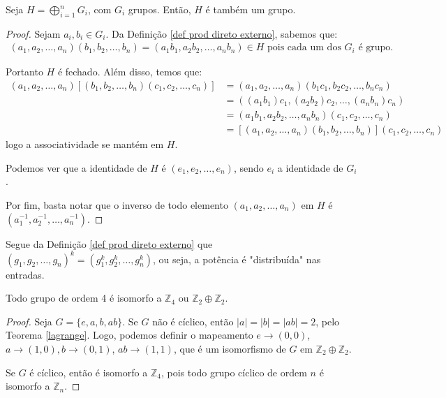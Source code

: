	\begin{theorem}
		Seja $\displaystyle{H = \bigoplus_{i=1}^{n}G_i}$, com $G_i$ grupos. Então, $H$ é também um grupo.
	\end{theorem}
	
	\begin{proof}
		Sejam $a_i, b_i\in G_i$. Da Definição \eqref{def prod direto externo}, sabemos que:
		\begin{align*}
		(a_1, a_2, \dots, a_n)(b_1, b_2, \dots, b_n) = (a_1b_1, a_2b_2, \dots, a_nb_n)\in H \text{ pois cada um dos } G_i \text{ é grupo.}
		\end{align*}
		\par Portanto $H$ é fechado. Além disso, temos que:
		\begin{align*}
		(a_1, a_2, \dots, a_n)[(b_1, b_2, \dots, b_n)(c_1, c_2, \dots, c_n)] &= (a_1, a_2, \dots, a_n)(b_1c_1, b_2c_2, \dots, b_nc_n) \\ &= ((a_1b_1)c_1, (a_2b_2)c_2, \dots, (a_nb_n)c_n) \\ &= (a_1b_1, a_2b_2, \dots, a_nb_n)(c_1, c_2, \dots, c_n) \\ &= [(a_1, a_2, \dots, a_n)(b_1, b_2, \dots, b_n)](c_1, c_2, \dots, c_n)
		\end{align*}
		logo a associatividade se mantém em $H$.
		\par\vspace{0.3cm} Podemos ver que a identidade de $H$ é $(e_1, e_2, \dots, e_n)$, sendo $e_i$ a identidade de $G_i$.
		\par\vspace{0.3cm} Por fim, basta notar que o inverso de todo elemento $(a_1, a_2, \dots, a_n)$ em $H$ é $(a_1^{-1}, a_2^{-1}, \dots, a_n^{-1})$.
		
	\end{proof}
	
	\begin{remark}
		Segue da Definição \eqref{def prod direto externo} que $(g_1, g_2, \dots, g_n)^k = (g_1^k, g_2^k, \dots, g_n^k)$, ou seja, a potência é "distribuída" nas entradas.
	\end{remark}
	
	\begin{theorem}
		Todo grupo de ordem 4 é isomorfo a $\mathbb{Z}_4$ ou $\mathbb{Z}_2\oplus\mathbb{Z}_2$.
	\end{theorem}
	
	\begin{proof}
		Seja $G = \{e, a, b, ab\}$. Se $G$ não é cíclico, então $|a| = |b| = |ab| = 2$, pelo Teorema \eqref{lagrange}. Logo, podemos definir o mapeamento $e\to (0,0)$, $a\to (1,0), b\to (0,1)$, $ab\to (1,1)$, que é um isomorfismo de $G$ em $\mathbb{Z}_2\oplus\mathbb{Z}_2$.
		\par\vspace{0.3cm} Se $G$ é cíclico, então é isomorfo a $\mathbb{Z}_4$, pois todo grupo cíclico de ordem $n$ é isomorfo a $\mathbb{Z}_n$. 
		
	\end{proof}
	
